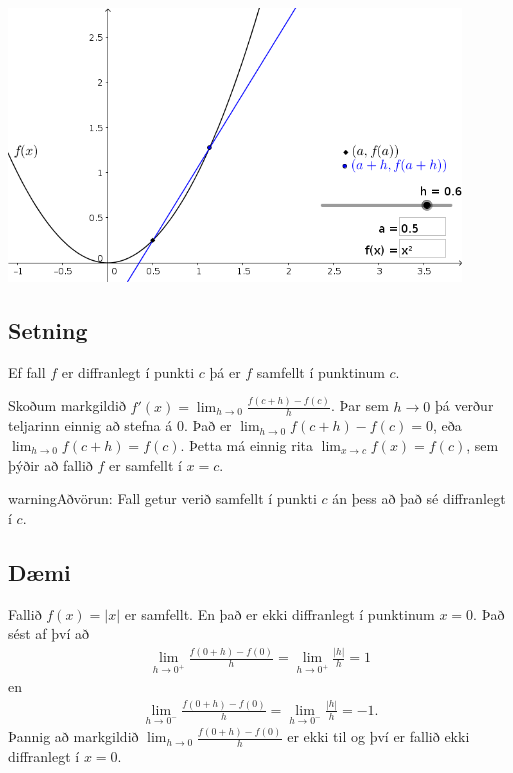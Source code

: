 \documentclass[a4paper,10pt,icelandic]{sphinxmanual}
\begin{document}
\begin{center}
\includegraphics[width=12cm,keepaspectratio=true]{./01_afleida.png}
\end{center}



\subsection{Setning}
\label{\detokenize{kafli03:setning}}
Ef fall \(f\) er diffranlegt í punkti \(c\) þá er \(f\)
samfellt í punktinum \(c\).


Skoðum markgildið \(f'(x)=\lim_{h\to 0} \frac{f(c+h)-f(c)}{h}\). Þar
sem \(h\to 0\) þá verður teljarinn einnig að stefna á 0. Það er
\(\lim_{h \to 0} f(c+h)-f(c) = 0\), eða
\(\lim_{h \to 0} f(c+h) = f(c)\). Þetta má einnig rita
\(\lim_{x \to c} f(x) = f(c)\), sem þýðir að fallið \(f\) er
samfellt í \(x=c\).

\begin{sphinxadmonition}{warning}{Aðvörun:}
Fall getur verið samfellt í punkti \(c\) án þess að það sé
diffranlegt í \(c\).
\end{sphinxadmonition}


\subsection{Dæmi}
\label{\detokenize{kafli03:id1}}
Fallið \(f(x) = |x|\) er samfellt. En það er ekki diffranlegt í
punktinum \(x=0\). Það sést af því að
\begin{equation*}
\begin{split}\lim_{h\to 0^+} \frac{f(0+h)-f(0)}{h} = \lim_{h\to 0^+} \frac{|h|}{h} = 1\end{split}
\end{equation*}
en
\begin{equation*}
\begin{split}\lim_{h\to 0^-} \frac{f(0+h)-f(0)}{h} = \lim_{h\to 0^-} \frac{|h|}{h} = -1.\end{split}
\end{equation*}
Þannig að markgildið \(\lim_{h\to 0} \frac{f(0+h)-f(0)}{h}\) er ekki til og því er
fallið ekki diffranlegt í \(x=0\).
\end{document}
